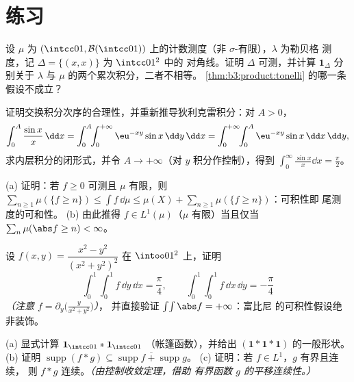 \section{练习}

\begin{exercise}[$\star$]\label{exo:b3:product:1}
设 $\mu$ 为 $(\intcc01, \mathcal
B(\intcc01))$ 上的计数测度（非 $\sigma$-有限），$\lambda$ 为勒贝格
测度，记 $\Delta = \{(x,x)\}$ 为 $\intcc01^2$ 中的
对角线。证明 $\Delta$ 可测，并计算 $\mathbf 1_\Delta$ 分别关于
$\lambda$ 与 $\mu$ 的两个累次积分，二者不相等。
\cref{thm:b3:product:tonelli} 的哪一条
假设不成立？
\end{exercise}

\begin{exercise}[$\star$]\label{exo:b3:product:2}
证明交换积分次序的合理性，并重新推导狄利克雷积分：对
$A > 0$，
\[
\int_0^A\frac{\sin x}x\,\dd x
= \int_0^A\!\!\int_0^{+\infty}\eu^{-xy}\sin x\,\dd y\,\dd x
= \int_0^{+\infty}\!\!\int_0^A \eu^{-xy}\sin x\,\dd x\,\dd y,
\]
求内层积分的闭形式，并令 $A \to
+\infty$（对 $y$ 积分作控制），得到
$\int_0^\infty\frac{\sin x}x\dd x = \frac\pi2$。
\end{exercise}

\begin{exercise}[$\star\star$]\label{exo:b3:product:3}
(a) 证明：若 $f \geq 0$ 可测且 $\mu$ 有限，则
$\sum_{n\geq1}\mu(\{f \geq n\}) \leq \int f\,\dd\mu \leq
\mu(X) + \sum_{n\geq1}\mu(\{f\geq n\})$：可积性即
尾测度的可和性。
(b) 由此推得 $f \in L^1(\mu)$（$\mu$ 有限）当且仅当
$\sum_n\mu(\abs f \geq n) < \infty$。
\end{exercise}

\begin{exercise}[$\star\star$]\label{exo:b3:product:4}
设 $f(x, y) = \dfrac{x^2 - y^2}{(x^2 + y^2)^2}$ 在
$\intoo01^2$ 上，证明
\[
\int_0^1\!\!\int_0^1 f\,\dd y\,\dd x = \frac\pi4,
\qquad
\int_0^1\!\!\int_0^1 f\,\dd x\,\dd y = -\frac\pi4
\]
\emph{（注意 $f = \partial_y\bigl(\frac{y}{x^2+y^2}\bigr)$）}，
并直接验证 $\int\!\int\abs f = +\infty$：富比尼
的可积性假设绝非装饰。
\end{exercise}

\begin{exercise}[$\star\star$]\label{exo:b3:product:5}
(a) 显式计算 $\mathbf 1_{\intcc01} * \mathbf 1_{\intcc01}$
（帐篷函数），并给出 $(\mathbf 1 * \mathbf 1 *
\mathbf 1)$ 的一般形状。
(b) 证明 $\operatorname{supp}(f * g) \subseteq
\overline{\operatorname{supp}f + \operatorname{supp}g}$。
(c) 证明：若 $f \in L^1$，$g$ 有界且连续，
则 $f * g$ 连续。\emph{（由控制收敛定理，借助
有界函数 $g$ 的平移连续性。）}
\end{exercise}

